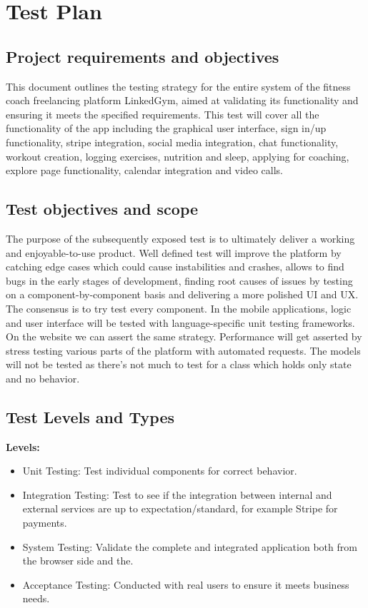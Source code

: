 \section{Test Plan}

\subsection{Project requirements and objectives}
This document outlines the testing strategy for the entire system of the fitness coach freelancing platform LinkedGym, aimed at validating its functionality and ensuring it meets the specified requirements.
This test will cover all the functionality of the app including the graphical user interface, sign in/up functionality, stripe integration, social media integration, chat functionality, workout creation, logging exercises, nutrition and sleep, applying for coaching, explore page functionality, calendar integration and video calls.

\subsection{Test objectives and scope}
The purpose of the subsequently exposed test is to ultimately deliver a working and enjoyable-to-use product. Well defined test will improve the platform by catching edge cases which could cause instabilities and crashes, allows to find bugs in the early stages of development, finding root causes of issues by testing on a component-by-component basis and delivering a more polished UI and UX. The consensus is to try test every component. In the mobile applications, logic and user interface will be tested with language-specific unit testing frameworks. On the website we can assert the same strategy. Performance will get asserted by stress testing various parts of the platform with automated requests. The models will not be tested as there's not much to test for a class which holds only state and no behavior.

\subsection{Test Levels and Types}
\textbf{Levels:}\\
\begin{itemize}
    \item Unit Testing: Test individual components for correct behavior.
    \item Integration Testing: Test to see if the integration between internal and external services are up to expectation/standard, for example Stripe for payments.
    \item System Testing: Validate the complete and integrated application both from the browser side and the.
    \item Acceptance Testing: Conducted with real users to ensure it meets business needs.
\end{itemize}


